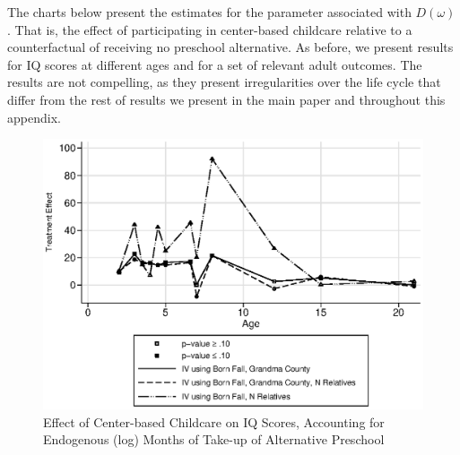 \begin{appendices}
\noindent The charts below present the estimates for the parameter associated with $D(\omega)$. That is, the effect of participating in center-based childcare relative to a counterfactual of receiving no preschool alternative. As before, we present results for IQ scores at different ages and for a set of relevant adult outcomes. The results are not compelling, as they present irregularities over the life cycle that differ from the rest of results we present in the main paper and throughout this appendix. 

\begin{figure}[H]
		\caption{Effect of Center-based Childcare on IQ Scores, Accounting for Endogenous (log) Months of Take-up of Alternative Preschool} \label{output/appendixplots/Q_cf_te.eps}
		\includegraphics[width=.7\columnwidth]{output/appendixplots/ins_inter_logQ_iv_te.eps}
\end{figure}


\end{appendices}

